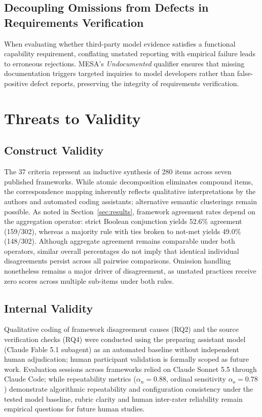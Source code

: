 \documentclass[runningheads]{llncs}
\begin{document}
\subsection{Decoupling Omissions from Defects in Requirements Verification}
When evaluating whether third-party model evidence satisfies a functional capability requirement, conflating unstated reporting with empirical failure leads to erroneous rejections. MESA's \emph{Undocumented} qualifier ensures that missing documentation triggers targeted inquiries to model developers rather than false-positive defect reports, preserving the integrity of requirements verification.

\section{Threats to Validity}
\label{sec:threats}

\subsection{Construct Validity}
The 37 criteria represent an inductive synthesis of 280 items across seven published frameworks. While atomic decomposition eliminates compound items, the correspondence mapping inherently reflects qualitative interpretations by the authors and automated coding assistants; alternative semantic clusterings remain possible. As noted in Section~\ref{sec:results}, framework agreement rates depend on the aggregation operator: strict Boolean conjunction yields 52.6\% agreement (159/302), whereas a majority rule with ties broken to not-met yields 49.0\% (148/302). Although aggregate agreement remains comparable under both operators, similar overall percentages do not imply that identical individual disagreements persist across all pairwise comparisons. Omission handling nonetheless remains a major driver of disagreement, as unstated practices receive zero scores across multiple sub-items under both rules.

\subsection{Internal Validity}
Qualitative coding of framework disagreement causes (RQ2) and the source verification checks (RQ4) were conducted using the preparing assistant model (Claude Fable 5.1 subagent) as an automated baseline without independent human adjudication; human participant validation is formally scoped as future work. Evaluation sessions across frameworks relied on Claude Sonnet 5.5 through Claude Code; while repeatability metrics ($\alpha_n = 0.88$, ordinal sensitivity $\alpha_o = 0.78$) demonstrate algorithmic repeatability and configuration consistency under the tested model baseline, rubric clarity and human inter-rater reliability remain empirical questions for future human studies.
\end{document}
